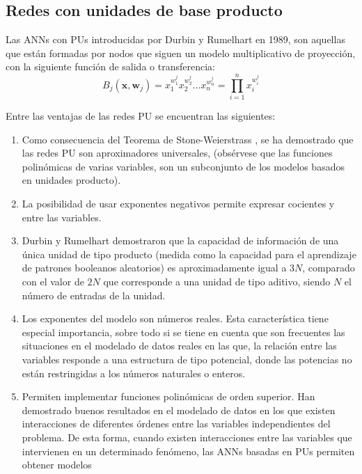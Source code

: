 \subsection{Redes con unidades de base producto}
\noindent     Las ANNs con PUs introducidas por Durbin y Rumelhart \cite{Durbin1989} en
1989, son aquellas que están formadas por nodos que siguen un modelo multiplicativo de
proyección, con la siguiente función de salida o transferencia:
\begin{displaymath}
B_{j}\left(\mathbf{x},\mathbf{w}_{j}\right)=x_{1}^{w_{1}^j}x_{2}^{w_{2}^j}...x_{n}^{
	w_{n}^j}=\prod_{i=1}^n x_{i}^{w_{i}^j}
\end{displaymath}

Entre las ventajas de las redes PU se encuentran las siguientes:
\begin{enumerate}
	\item Como consecuencia del Teorema de Stone-Weierstrass \cite{Bishop1961}, se ha
	demostrado que las
	redes PU son aproximadores universales, (obsérvese que las funciones
	polinómicas de varias variables, son un subconjunto de los modelos basados en unidades
	producto).
	\item La  posibilidad  de  usar  exponentes  negativos  permite  expresar  cocientes  y
	entre  las variables.
	\item Durbin  y  Rumelhart \cite{Durbin1989} demostraron  que  la  capacidad  de
	información  de  una
	única unidad  de tipo  producto  (medida  como  la  capacidad  para  el  aprendizaje
	de	patrones booleanos aleatorios) es aproximadamente igual a $3N$, comparado con el
	valor de	$2N$ que corresponde a una unidad de tipo aditivo, siendo $N$ el número de
	entradas de la unidad.
	\item Los  exponentes  del  modelo  son  números  reales.  Esta  característica  tiene
	especial importancia,  sobre  todo  si  se  tiene  en  cuenta  que  son  frecuentes
	las	situaciones  en  el modelado de datos reales en las que, la relación entre las
	variables	responde a una estructura de  tipo  potencial,  donde  las  potencias  no
	están	restringidas  a  los  números naturales  o enteros.
	\item Permiten  implementar  funciones  polinómicas  de  orden  superior.  Han
	demostrado	buenos resultados en el modelado de datos en los que existen interacciones
	de diferentes	órdenes entre  las  variables  independientes  del  problema.  De  esta
	forma,	cuando existen interacciones  entre  las  variables  que  intervienen  en  un
	determinado  fenómeno, las  ANNs basadas en PUs permiten obtener modelos

\end{enumerate}
